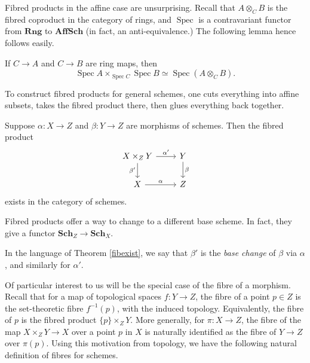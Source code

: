 \documentclass[11pt,openany]{book} %
\newcommand{\spc}{\operatorname{Spec}}
\begin{document}
Fibred products in the affine case are unsurprising. Recall that $A \otimes_C B$ is the fibred coproduct in the category of rings, and $\spc$ is a contravariant functor from $\mathbf{Rng}$ to $\mathbf{AffSch}$ (in fact, an anti-equivalence.) The following lemma hence follows easily.\\

\begin{lemma}
If $C \to A$ and $C \to B$ are ring maps, then
\[
\spc A \times_{\spc C} \spc B \simeq \spc (A \otimes_C B).
\]
\end{lemma}
\medskip

To construct fibred products for general schemes, one cuts everything into affine subsets, takes the fibred product there, then glues everything back together.\\

\begin{theorem} \label{fibexist}
Suppose $\alpha : X \to Z$ and $\beta : Y \to Z$ are morphisms of schemes. Then the fibred product
\[
\begin{tikzcd}
X \times_Z Y \ar[d, "\beta'", swap] \ar[r, "\alpha'"] & Y \ar[d, "\beta"] \\
X \ar[r, "\alpha"] & Z
\end{tikzcd}
\]
exists in the category of schemes.
\end{theorem}
\medskip

Fibred products offer a way to change to a different base scheme. In fact, they give a functor $\mathbf{Sch}_Z \to \mathbf{Sch}_X$.\\

\begin{definition}
In the language of Theorem \ref{fibexist}, we say that $\beta'$ is the \emph{base change} of $\beta$ via $\alpha$, and similarly for $\alpha'$.
\end{definition}


Of particular interest to us will be the special case of the fibre of a morphism. Recall that for a map of topological spaces $f: Y \to Z$, the fibre of a point $p \in Z$ is the set-theoretic fibre $f^{-1}(p)$, with the induced topology. Equivalently, the fibre of $p$ is the fibred product $\{p\} \times_Z Y$. More generally, for $\pi : X \to Z$, the fibre of the map $X \times_Z Y \to X$ over a point $p$ in $X$ is naturally identified as the fibre of $Y \to Z$ over $\pi(p)$. Using this motivation from topology, we have the following natural definition of fibres for schemes.\\
\end{document}
